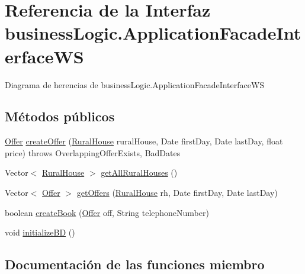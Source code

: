 \hypertarget{interfacebusiness_logic_1_1_application_facade_interface_w_s}{}\section{Referencia de la Interfaz business\+Logic.\+Application\+Facade\+Interface\+WS}
\label{interfacebusiness_logic_1_1_application_facade_interface_w_s}


Diagrama de herencias de business\+Logic.\+Application\+Facade\+Interface\+WS
\subsection*{Métodos públicos}
\begin{DoxyCompactItemize}
\item 
\mbox{\hyperlink{classdomain_1_1_offer}{Offer}} \mbox{\hyperlink{interfacebusiness_logic_1_1_application_facade_interface_w_s_a0e8d2135ef1384a32e74f60bcea55f09}{create\+Offer}} (\mbox{\hyperlink{classdomain_1_1_rural_house}{Rural\+House}} rural\+House, Date first\+Day, Date last\+Day, float price)  throws Overlapping\+Offer\+Exists, Bad\+Dates
\item 
Vector$<$ \mbox{\hyperlink{classdomain_1_1_rural_house}{Rural\+House}} $>$ \mbox{\hyperlink{interfacebusiness_logic_1_1_application_facade_interface_w_s_a553cbfb37ea9f1621ba76ad8308a15da}{get\+All\+Rural\+Houses}} ()
\item 
Vector$<$ \mbox{\hyperlink{classdomain_1_1_offer}{Offer}} $>$ \mbox{\hyperlink{interfacebusiness_logic_1_1_application_facade_interface_w_s_ae338a96d039003c64fceb68d667736f1}{get\+Offers}} (\mbox{\hyperlink{classdomain_1_1_rural_house}{Rural\+House}} rh, Date first\+Day, Date last\+Day)
\item 
boolean \mbox{\hyperlink{interfacebusiness_logic_1_1_application_facade_interface_w_s_a1fd4f6fccc600ed8127e06fa34a10512}{create\+Book}} (\mbox{\hyperlink{classdomain_1_1_offer}{Offer}} off, String telephone\+Number)
\item 
void \mbox{\hyperlink{interfacebusiness_logic_1_1_application_facade_interface_w_s_a59eacfa5890466c6a338d0df2e487965}{initialize\+BD}} ()
\end{DoxyCompactItemize}


\subsection{Documentación de las funciones miembro}
\mbox{\label{interfacebusiness_logic_1_1_application_facade_interface_w_s_a1fd4f6fccc600ed8127e06fa34a10512}} 
